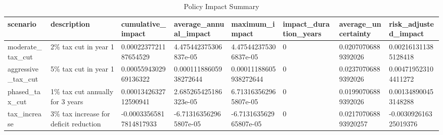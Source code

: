 \begin{table}[H]
\centering
\caption{Policy Impact Summary}
\begin{tabular}{|l|l|l|l|l|l|l|l|}
\hline
scenario & description & cumulative\_impact & average\_annual\_impact & maximum\_impact & impact\_duration\_years & average\_uncertainty & risk\_adjusted\_impact \\
\hline
moderate\_tax\_cut & 2\% tax cut in year 1 & 0.0002237721187654529 & 4.475442375306837e-05 & 4.475442375306837e-05 & 0 & 0.02070706889392026 & 0.002161311385128418 \\
aggressive\_tax\_cut & 5\% tax cut in year 1 & 0.0005594302969136322 & 0.00011188605938272644 & 0.00011188605938272644 & 0 & 0.02370706889392026 & 0.004719523104411272 \\
phased\_tax\_cut & 1\% tax cut annually for 3 years & 0.0001342632712590941 & 2.685265425186323e-05 & 6.713163562965807e-05 & 0 & 0.01990706889392026 & 0.001348900453148288 \\
tax\_increase & 3\% tax increase for deficit reduction & -0.00033565817814817933 & -6.713163562965807e-05 & -6.713163562965807e-05 & 0 & 0.021707068893920257 & -0.003092616325019376 \\
\hline
\end{tabular}
\end{table}


